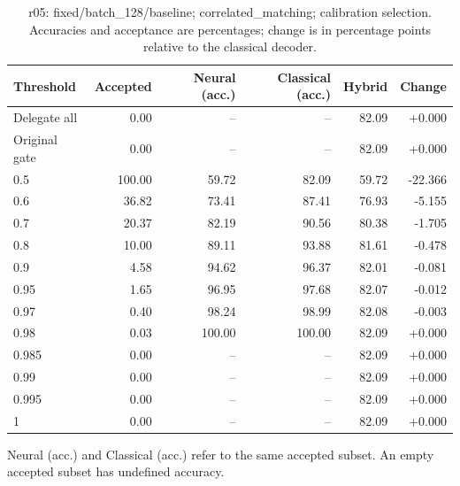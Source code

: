 \begin{table}[htbp]
\centering\small
\setlength{\tabcolsep}{3pt}
\caption{r05: fixed/batch\_128/baseline; correlated\_matching; calibration selection. Accuracies and acceptance are percentages; change is in percentage points relative to the classical decoder.}
\begin{tabular}{lrrrrr}
\toprule
Threshold & Accepted & Neural (acc.) & Classical (acc.) & Hybrid & Change \\
\midrule
Delegate all & 0.00 & -- & -- & 82.09 & +0.000 \\
Original gate & 0.00 & -- & -- & 82.09 & +0.000 \\
0.5 & 100.00 & 59.72 & 82.09 & 59.72 & -22.366 \\
0.6 & 36.82 & 73.41 & 87.41 & 76.93 & -5.155 \\
0.7 & 20.37 & 82.19 & 90.56 & 80.38 & -1.705 \\
0.8 & 10.00 & 89.11 & 93.88 & 81.61 & -0.478 \\
0.9 & 4.58 & 94.62 & 96.37 & 82.01 & -0.081 \\
0.95 & 1.65 & 96.95 & 97.68 & 82.07 & -0.012 \\
0.97 & 0.40 & 98.24 & 98.99 & 82.08 & -0.003 \\
0.98 & 0.03 & 100.00 & 100.00 & 82.09 & +0.000 \\
0.985 & 0.00 & -- & -- & 82.09 & +0.000 \\
0.99 & 0.00 & -- & -- & 82.09 & +0.000 \\
0.995 & 0.00 & -- & -- & 82.09 & +0.000 \\
1 & 0.00 & -- & -- & 82.09 & +0.000 \\
\bottomrule
\end{tabular}
\par\smallskip\footnotesize Neural (acc.) and Classical (acc.) refer to the same accepted subset. An empty accepted subset has undefined accuracy.
\end{table}
